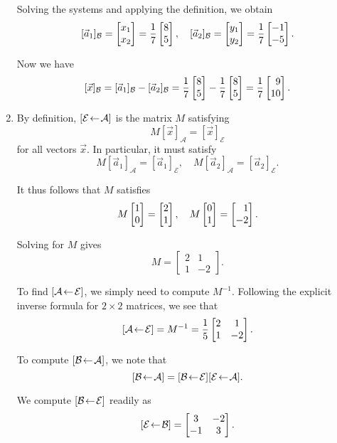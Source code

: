 \begin{exercises}
\begin{problist}
\begin{solution}
\begin{enumerate}
				Solving the systems and applying the definition, we obtain
				\[
					[\vec a_1]_{\mathcal B}=\mat{x_1\\x_2}=\frac{1}{7}\mat{8\\5},\quad
					[\vec a_2]_{\mathcal B}=\mat{y_1\\y_2}=\frac{1}{7}\mat{-1\\-5}.
				\]
				
				Now we have
				\[
					[\vec x]_{\mathcal B}=[\vec a_1]_{\mathcal B}-[\vec a_2]_{\mathcal B}=\frac{1}{7}\mat{8\\5}-\frac{1}{7}\mat{8\\5}=\frac{1}{7}\mat{9\\10}.
				\]
				\item By definition, $\BasisChange{\mathcal A}{\mathcal E}$ is the matrix $M$ satisfying
				\[
					M[\vec x]_{\mathcal A}=[\vec x]_{\mathcal E}
				\]
				for all vectors $\vec x$. In particular, it must satisfy
				\[
					M[\vec a_1]_{\mathcal A}=[\vec a_1]_{\mathcal E},\quad
					M[\vec a_2]_{\mathcal A}=[\vec a_2]_{\mathcal E}.
				\]
				
				It thus follows that $M$ satisfies
				\[
					M\mat{1\\0}=\mat{2\\1},\quad
					M\mat{0\\1}=\mat{1\\-2}.
				\]
				
				Solving for $M$ gives
				\[
					M=
					\begin{bmatrix}
						2 & 1 \\ 1 & -2
					\end{bmatrix}.
				\]
				
				To find $\BasisChange{\mathcal E}{\mathcal A}$, we simply need to compute $M^{-1}$.
				Following the explicit inverse formula for $2\times2$ matrices, we see that
				\[
					\BasisChange{\mathcal E}{\mathcal A}=M^{-1}=\frac{1}{5}
					\begin{bmatrix}
						2 & 1 \\ 1 & -2
					\end{bmatrix}.
				\]
				
				To compute $\BasisChange{\mathcal A}{\mathcal B}$, we note that
				\[
					\BasisChange{\mathcal A}{\mathcal B}=\BasisChange{\mathcal E}{\mathcal B}\BasisChange{\mathcal A}{\mathcal E}.
				\]
				
				We compute $\BasisChange{\mathcal E}{\mathcal B}$ readily as
				\[
					\BasisChange{\mathcal B}{\mathcal E}=
					\begin{bmatrix}
						3 & -2 \\ -1 & 3
					\end{bmatrix}.
				\]
				

\end{enumerate}
\end{solution}
\end{problist}
\end{exercises}
